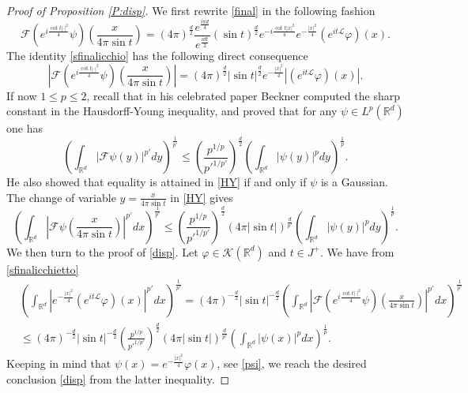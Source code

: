 \documentclass[11pt,a4paper]{amsart}
\def \R {\mathbb{R}}
\def \vf{\varphi}
\newcommand{\Rm}{\mathbb R^d}
\numberwithin{equation}{section}
\numberwithin{equation}{section}
\begin{document}
\begin{proof}[Proof of Proposition \ref{P:disp}]
We first rewrite \eqref{final} in the following fashion
\begin{equation}\label{sfinalicchio}
\mathscr F\left(e^{i \frac{\cot t |\cdot|^2}4} \psi\right)(\frac{x}{4 \pi \sin t}) = (4\pi
)^{\frac{d}{2}}  \frac{e^{\frac{i\pi d}{4}}}{e^{\frac{idt}2}} (\sin t)^{\frac d2} e^{-i \frac{\cot t |x|^2}{4}} e^{- \frac{|x|^2}{4}} \left(e^{it\mathscr L}\vf\right)(x).
\end{equation}
The identity \eqref{sfinalicchio} has the following direct consequence 
\begin{equation}\label{sfinalicchietto}
\left|\mathscr F\left(e^{i \frac{\cot t |\cdot|^2}4} \psi\right)(\frac{x}{4 \pi \sin t})\right| = (4\pi
)^{\frac{d}{2}} |\sin t|^{\frac d2} e^{- \frac{|x|^2}{4}} |(e^{it\mathscr L}\vf)(x)|.
\end{equation}
If now $1\le p \le 2$, recall that in his celebrated paper \cite{Be} Beckner computed the sharp constant in the Hausdorff-Young inequality, and proved that for any $\psi\in L^p(\Rm)$ one has
\begin{equation}\label{HY}
\left(\int_{\Rm}|\mathscr F \psi(y)|^{p'} dy\right)^{\frac{1}{p'}} \le \left(\frac{p^{1/p}}{{p'}^{1/p'}}\right)^{\frac d2} \left(\int_{\Rm}|\psi(y)|^p dy\right)^{\frac 1p}.
\end{equation}
He also showed that equality is attained in \eqref{HY} if and only if $\psi$ is a Gaussian. The change of variable $y = \frac{x}{4 \pi \sin t}$ in \eqref{HY} gives
\begin{equation*}
\left(\int_{\R^d}|\mathscr F \psi(\frac{x}{4 \pi \sin t})|^{p'} dx\right)^{\frac{1}{p'}} \le \left(\frac{p^{1/p}}{{p'}^{1/p'}}\right)^{\frac d2} (4\pi |\sin t|)^{\frac{d}{p'}}\left(\int_{\Rm}|\psi(y)|^p dy\right)^{\frac 1p}.
\end{equation*}
We then turn to the proof of \eqref{disp}. Let $\vf\in \mathscr K(\Rm)$ and $t\in J^+$. We have from \eqref{sfinalicchietto} 
\begin{align*}
& \left(\int_{\R^d}|e^{- \frac{|x|^2}{4}} (e^{it\mathscr L}\vf)(x)|^{p'} dx\right)^{\frac{1}{p'}} = (4\pi
)^{-\frac{d}{2}} |\sin t|^{-\frac d2} \left(\int_{\Rm} \left|\mathscr F\left(e^{i \frac{\cot t |\cdot|^2}4} \psi\right)(\frac{x}{4 \pi \sin t})\right|^{p'} dx\right)^{\frac{1}{p'}} 
\\
& \le (4\pi
)^{-\frac{d}{2}} |\sin t|^{-\frac d2} \left(\frac{p^{1/p}}{{p'}^{1/p'}}\right)^{\frac d2} (4\pi |\sin t|)^{\frac{d}{p'}}\left(\int_{\Rm} |\psi(x)|^{p} dx\right)^{\frac{1}{p}}. 
\end{align*}
Keeping in mind that $\psi(x) = e^{- \frac{|x|^2}{4}} \vf(x)$, see \eqref{psi}, we reach the desired conclusion \eqref{disp} from the latter inequality.

 
\end{proof}
\end{document}
